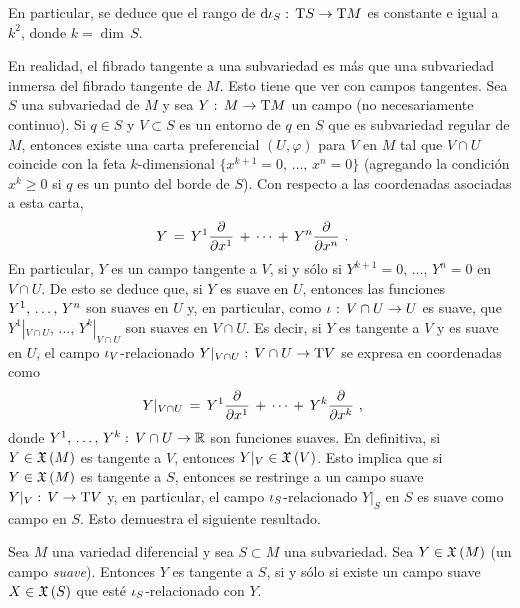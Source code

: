 En particular, se deduce que el rango de $\diferencial{\inc[S]}:\,%
\tangente{S}\rightarrow\tangente{M}$ es constante e igual a $k^{2}$, donde
$k=\dim\,S$.

En realidad, el fibrado tangente a una subvariedad es m\'{a}s que una
subvariedad inmersa del fibrado tangente de $M$. Esto tiene que ver
con campos tangentes. Sea $S$ una subvariedad de $M$ y sea
$Y:\,M\rightarrow\tangente{M}$ un campo (no necesariamente continuo).
Si $q\in S$ y $V\subset S$ es un entorno de $q$ en $S$ que es subvariedad
regular de $M$, entonces existe una carta preferencial $(U,\varphi)$
para $V$ en $M$ tal que $V\cap U$ coincide con la feta $k$-dimensional
$\{x^{k+1}=0,\,\dots,\,x^{n}=0\}$ (agregando la condici\'{o}n $x^{k}\geq 0$
si $q$ es un punto del borde de $S$). Con respecto a las coordenadas
asociadas a esta carta,
\begin{align*}
	Y & \,=\,Y^{1}\gancho{x^{1}}\,+\,\cdots\,+\,
		Y^{n}\gancho{x^{n}}
	\text{ .}
\end{align*}
%
En particular, $Y$ es un campo tangente a $V$, si y s\'{o}lo si
$Y^{k+1}=0,\,\dots,\,Y^{n}=0$ en $V\cap U$. De esto se deduce que,
si $Y$ es suave en $U$, entonces las funciones $\lista*{Y}{n}$ son suaves
en $U$ y, en particular, como $\inc:\,V\cap U\rightarrow U$ es suave, que
$Y^{1}|_{V\cap U},\,\dots,\,Y^{k}|_{V\cap U}$ son suaves en $V\cap U$.
Es decir, si $Y$ es tangente a $V$ y es suave en $U$, el campo
$\inc[V]$-relacionado $Y|_{V\cap U}:\,V\cap U\rightarrow\tangente{V}$
se expresa en coordenadas como
\begin{align*}
	Y|_{V\cap U} & \,=\,Y^{1}\gancho{x^{1}}\,+\,\cdots\,+\,
		Y^{k}\gancho{x^{k}}
	\text{ ,}
\end{align*}
%
donde $Y^{1},\,\dots,\,Y^{k}:\,V\cap U\rightarrow\bb{R}$ son funciones
suaves. En definitiva, si $Y\in\champs{M}$ es tangente a $V$, entonces
$Y|_{V}\in\champs{V}$. Esto implica que si $Y\in\champs{M}$ es tangente a $S$,
entonces se restringe a un campo suave $Y|_{V}:\,V\rightarrow\tangente{V}$ y,
en particular, el campo $\inc[S]$-relacionado $Y|_{S}$ en $S$ es suave
como campo en $S$. Esto demuestra el siguiente resultado.

\begin{propoCamposTangentesSuaves}\label{thm:campostangentessuaves}
	Sea $M$ una variedad diferencial y sea $S\subset M$ una subvariedad.
	Sea $Y\in\champs{M}$ (un campo \emph{suave}). Entonces $Y$ es
	tangente a $S$, si y s\'{o}lo si existe un campo suave
	$X\in\champs{S}$ que est\'{e} $\inc[S]$-relacionado con $Y$.
\end{propoCamposTangentesSuaves}

